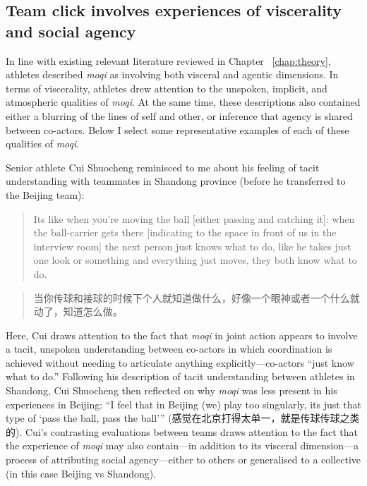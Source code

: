 \begin{CJK}{UTF8}{gbsn}
\subsection{Team click involves experiences of viscerality and social agency}
In line with existing relevant literature reviewed in Chapter ~\ref{chap:theory}, athletes described \textit{moqi} as involving both visceral and agentic dimensions.  In terms of viscerality, athletes drew attention to the unspoken, implicit, and atmospheric qualities of \textit{moqi}.  At the same time, these descriptions also contained either a blurring of the lines of self and other, or inference that agency is shared between co-actors.  Below I select some representative examples of each of these qualities of \textit{moqi}.

Senior athlete Cui Shuocheng reminisced to me about his feeling of tacit understanding with teammates in Shandong province (before he transferred to the Beijing team):

\begin{quote}
       Its like when you're moving the ball [either passing and catching it]: when the ball-carrier gets there [indicating to the space in front of us in the interview room] the next person just knows what to do, like he takes just one look or something and everything just moves, they both know what to do.
\end{quote}

\begin{quote}
         当你传球和接球的时候下个人就知道做什么，好像一个眼神或者一个什么就动了，知道怎么做。
\end{quote}

Here, Cui draws attention to the fact that \textit{moqi} in joint action appears to involve a tacit, unspoken understanding between co-actors in which coordination is achieved without needing to articulate anything explicitly---co-actors ``just know what to do.''   Following his description of tacit understanding between athletes in Shandong, Cui Shuocheng then reflected on why \textit{moqi} was less present in his experiences in Beijing: ``I feel that in Beijing (we) play too singularly, its just that type of `pass the ball, pass the ball'''  (感觉在北京打得太单一，就是传球传球之类的).  Cui's contrasting evaluations  between teams draws attention to the fact that the experience of \textit{moqi} may also contain---in addition to its visceral dimension---a process of attributing social agency---either to others or generalised to a collective (in this case Beijing vs Shandong).


\end{CJK}

